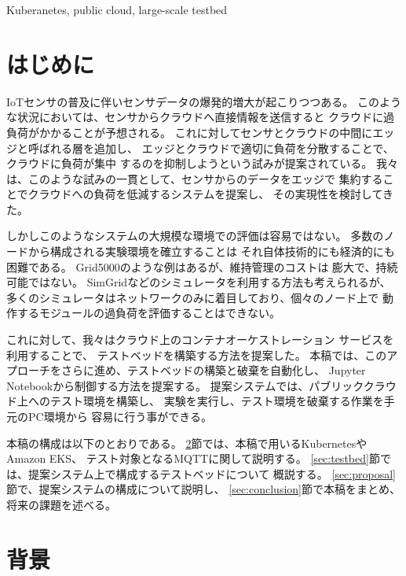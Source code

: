 \documentclass[submit,techrep]{ipsj}
\newcommand{\kbs}{Kubernetes}
\begin{document}
\begin{ekeyword}
  Kuberanetes, public cloud, large-scale testbed
\end{ekeyword}

\maketitle

\section{はじめに}

IoTセンサの普及に伴いセンサデータの爆発的増大が起こりつつある。
このような状況においては、センサからクラウドへ直接情報を送信すると
クラウドに過負荷がかかることが予想される。
これに対してセンサとクラウドの中間にエッジと呼ばれる層を追加し、
エッジとクラウドで適切に負荷を分散することで、クラウドに負荷が集中
するのを抑制しようという試みが提案されている\cite{iot}\cite{Edge-computing}。
我々は、このような試みの一貫として、センサからのデータをエッジで
集約することでクラウドへの負荷を低減するシステムを提案し、
その実現性を検討してきた\cite{tou-os}。

しかしこのようなシステムの大規模な環境での評価は容易ではない。
多数のノードから構成される実験環境を確立することは
それ自体技術的にも経済的にも困難である。
Grid5000\cite{grid5000}のような例はあるが、維持管理のコストは
膨大で、持続可能ではない。
%
SimGrid\cite{simgrid}などのシミュレータを利用する方法も考えられるが、
多くのシミュレータはネットワークのみに着目しており、個々のノード上で
動作するモジュールの過負荷を評価することはできない。

これに対して、我々はクラウド上のコンテナオーケストレーション
サービスを利用することで、
テストベッドを構築する方法を提案した\cite{tou-hpc}\cite{tou-imcom}。
本稿では、このアプローチをさらに進め、テストベッドの構築と破棄を自動化し、
Jupyter Notebook\cite{jupyternotebook}から制御する方法を提案する。
提案システムでは、パブリッククラウド上へのテスト環境を構築し、
実験を実行し、テスト環境を破棄する作業を手元のPC環境から
容易に行う事ができる。

本稿の構成は以下のとおりである。
\ref{sec:background}節では、本稿で用いる\kbs やAmazon EKS、
テスト対象となるMQTTに関して説明する。
\ref{sec:testbed}節では、提案システム上で構成するテストベッドについて
概説する。
\ref{sec:proposal}節で、提案システムの構成について説明し、
\ref{sec:conclusion}節で本稿をまとめ、将来の課題を述べる。

\section{背景}\label{sec:background}
\end{document}
